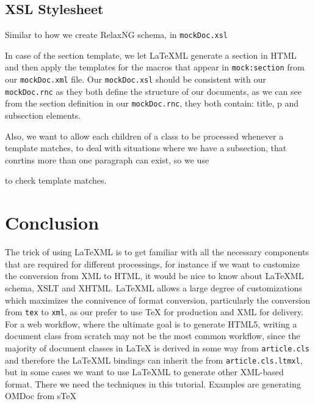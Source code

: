 \documentclass[a4paper]{article}
\def\latexml{{\LaTeX}ML\xspace}
\begin{document}
\subsection{XSL Stylesheet}
Similar to how we create RelaxNG schema, in \lstinline|mockDoc.xsl|
 

In case of the section template, we let \latexml generate a section in HTML and then apply the templates for the macros that appear in \lstinline|mock:section| from our \lstinline|mockDoc.xml| file. Our \lstinline|mockDoc.xsl| should be consistent with our \lstinline|mockDoc.rnc| as they both define the structure of our documents, as we can see from the section definition in our \lstinline|mockDoc.rnc|, they both contain: title, p and subsection elements.
 
Also, we want to allow each children of a class to be processed whenever a template matches, to deal with situations where we have a subsection, that conrtins more than one paragraph can exist, so we use
 
to check template matches.

\section{Conclusion}\label{sec:concl}
The trick of using \latexml is to get familiar with all the necessary components that are required for different processings, for instance if we want to customize the conversion from XML to HTML, it would be nice to know about \latexml schema, XSLT and XHTML. \latexml allows a large degree of customizations which maximizes the connivence of format conversion, particularly the conversion from \lstinline|tex| to \lstinline|xml|, as our prefer to use  {\TeX} for production and XML for delivery. For a web workflow, where the ultimate goal is to generate HTML5, writing a document class from scratch may not be the most common workflow, since the majority of document classes in {\LaTeX} is derived in some way from \lstinline|article.cls| and therefore
  the \latexml bindings can inherit the from \lstinline|article.cls.ltmxl|, but in some
  cases we want to use \latexml to generate other XML-based format. There we need the
  techniques in this tutorial. Examples are generating OMDoc from s\TeX{}


\newpage
\end{document}
